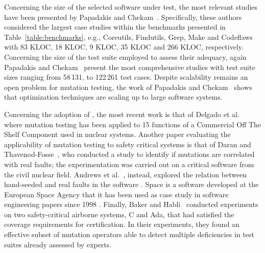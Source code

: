 Concerning the size of the selected software under test, the most relevant studies have been presented by Papadakis and Chekam~\cite{papadakis2018mutation,chekam2017empirical,papadakis2018mutant}. Specifically, these authors considered the largest case studies within the benchmarks presented in Table~\ref{table:benchmarks}, e.g., Coreutils, Findutils, Grep, Make and Codeflaws with 83 KLOC, 18 KLOC, 9 KLOC, 35 KLOC and 266 KLOC, respectively. 
Concerning the size of the test suite employed to assess their adequacy, again Papadakis and Chekam~\cite{papadakis2018mutation,chekam2017empirical,papadakis2018mutant} present the most comprehensive studies with test suite sizes ranging from 58\,131, to 122\,261 test cases.
Despite scalability remains an open problem for mutation testing, the work of Papadakis and Chekam~\cite{papadakis2018mutation,chekam2017empirical,papadakis2018mutant} shows that optimization techniques are scaling up to large software systems.

Concerning the adoption of , the most recent work is that of Delgado et al.~\cite{delgado2018evaluation} where mutation testing has been applied to 15 functions of a Commercial Off The Shelf Component used in nuclear systems. 
Another paper evaluating the applicability of mutation testing to safety critical systems is that of Daran and Thavenod-Fosse~\cite{daran1996software}, who conducted a study to identify if mutations are correlated with real faults; the experimentation was carried out on a critical software from the civil nuclear field. 
Andrews et al.~\cite{andrews2005mutation}, instead, explored the relation between hand-seeded and real faults in the software . Space is a software developed at the European Space Agency that it has been used as case study in software engineering papers since 1998 \cite{frankl1998further}.
Finally,  Baker and Habli~\cite{baker2012empirical} conducted experiments on two safety-critical airborne systems, C and Ada, that had satisfied the coverage requirements for certification. In their experiments, they found an effective subset of mutation operators able to detect multiple deficiencies in test suites already assessed by experts. 



